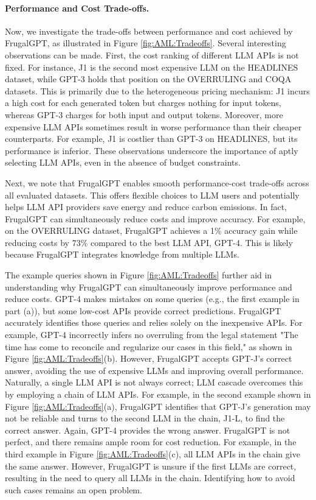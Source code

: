 \documentclass{article}
\numberwithin{equation}{section}
\newcommand{\systemFGPT}{{FrugalGPT}}
\begin{document}
\paragraph{Performance and Cost Trade-offs.}
Now, we investigate the trade-offs between performance and cost achieved by \systemFGPT{}, as illustrated in Figure \ref{fig:AML:Tradeoffs}. Several interesting observations can be made. First, the cost ranking of different LLM APIs is not fixed. For instance, J1 is the second most expensive LLM on the HEADLINES dataset, while GPT-3 holds that position on the OVERRULING and COQA datasets. This is primarily due to the heterogeneous pricing mechanism: J1 incurs a high cost for each generated token but charges nothing for input tokens, whereas GPT-3 charges for both input and output tokens. Moreover, more expensive LLM APIs sometimes result in worse performance than their cheaper counterparts. For example, J1 is costlier than GPT-3 on HEADLINES, but its performance is inferior. These observations underscore the importance of aptly selecting LLM APIs, even in the absence of budget constraints.

Next, we note that \systemFGPT{} enables smooth performance-cost trade-offs across all evaluated datasets. This offers flexible choices to LLM users and potentially helps LLM API providers save energy and reduce carbon emissions. In fact, \systemFGPT{} can simultaneously reduce costs and improve accuracy. For example, on the OVERRULING dataset, \systemFGPT{} achieves a 1\% accuracy gain while reducing costs by 73\% compared to the best LLM API, GPT-4. This is likely because \systemFGPT{} integrates knowledge from multiple LLMs. 

The example queries shown in Figure \ref{fig:AML:Tradeoffs} further aid in understanding why \systemFGPT{} can simultaneously improve performance and reduce costs. GPT-4 makes mistakes on some queries (e.g., the first example in part (a)), but some low-cost APIs provide correct predictions. \systemFGPT{} accurately identifies those queries and relies solely on the inexpensive APIs. For example, GPT-4 incorrectly infers no overruling from the legal statement "The time has come to reconcile and regularize our cases in this field," as shown in Figure \ref{fig:AML:Tradeoffs}(b). However, \systemFGPT{} accepts GPT-J's correct answer, avoiding the use of expensive LLMs and improving overall performance. Naturally, a single LLM API is not always correct; LLM cascade overcomes this by employing a chain of LLM APIs. For example, in the second example shown in Figure \ref{fig:AML:Tradeoffs}(a), \systemFGPT{} identifies that GPT-J's generation may not be reliable and turns to the second LLM in the chain, J1-L, to find the correct answer. Again, GPT-4 provides the wrong answer. \systemFGPT{} is not perfect, and there remains ample room for cost reduction. For example, in the third example in Figure \ref{fig:AML:Tradeoffs}(c), all LLM APIs in the chain give the same answer. However, \systemFGPT{} is unsure if the first LLMs are correct, resulting in the need to query all LLMs in the chain. Identifying how to avoid such cases remains an open problem.
\end{document}
